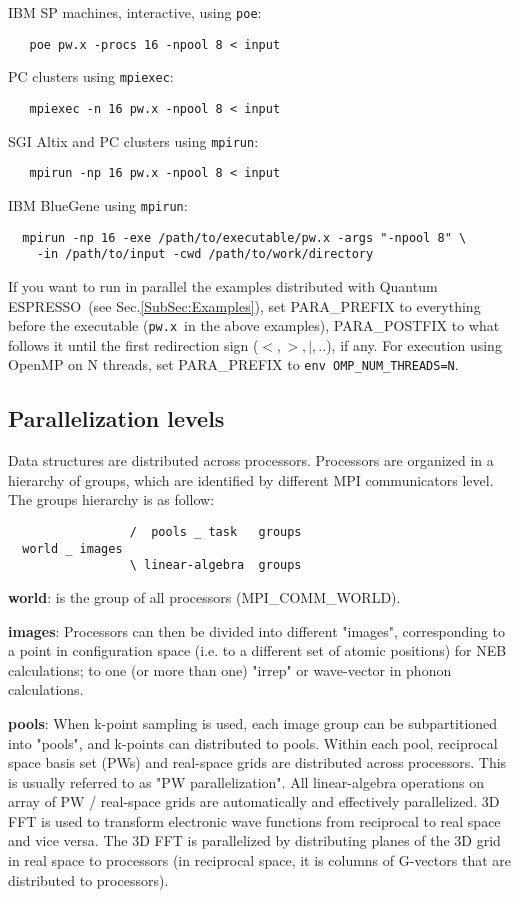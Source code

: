 \documentclass[12pt,a4paper]{article}
\def\qe{{\sc Quantum ESPRESSO}}
\def\pwx{\texttt{pw.x}}
\begin{document}
IBM SP machines, interactive, using \texttt{poe}:
\begin{verbatim}
   poe pw.x -procs 16 -npool 8 < input
\end{verbatim}
PC clusters using \texttt{mpiexec}:
\begin{verbatim}
   mpiexec -n 16 pw.x -npool 8 < input
\end{verbatim}
SGI Altix and PC clusters using \texttt{mpirun}:
\begin{verbatim}   mpirun -np 16 pw.x -npool 8 < input
\end{verbatim}
IBM BlueGene using \texttt{mpirun}:
 \begin{verbatim}
  mpirun -np 16 -exe /path/to/executable/pw.x -args "-npool 8" \
    -in /path/to/input -cwd /path/to/work/directory
\end{verbatim}
If you want to run in parallel the examples distributed with \qe\
(see Sec.\ref{SubSec:Examples}), set PARA\_PREFIX to everything
before the executable (\pwx\ in the above examples),
PARA\_POSTFIX to what follows it until the first redirection sign 
($<, >, |,..$), if any. For execution using OpenMP on N threads, 
set  PARA\_PREFIX to \texttt{env OMP\_NUM\_THREADS=N}.

\subsection{Parallelization levels}

Data structures are distributed across processors.
Processors are organized in a hierarchy of groups, 
which are identified by different MPI communicators level.
The groups hierarchy is as follow:
\begin{verbatim}
                 /  pools _ task   groups
  world _ images
                 \ linear-algebra  groups
\end{verbatim}

{\bf world}: is the group of all processors (MPI\_COMM\_WORLD).

{\bf images}: Processors can then be divided into different "images",
corresponding to a point in configuration space (i.e. to
a different set of atomic positions) for NEB calculations;
to one (or more than one) "irrep" or wave-vector in phonon
calculations.

{\bf pools}: When k-point sampling is used, each image group can be 
subpartitioned into "pools", and k-points can distributed to pools.
Within each pool, reciprocal space basis set (PWs)
and real-space grids are distributed across processors.
This is usually referred to as "PW parallelization".
All linear-algebra operations on array of  PW / 
real-space grids are automatically and effectively parallelized.
3D FFT is used to transform electronic wave functions from
reciprocal to real space and vice versa. The 3D FFT is
parallelized by distributing planes of the 3D grid in real
space to processors (in reciprocal space, it is columns of
G-vectors that are distributed to processors). 
\end{document}
